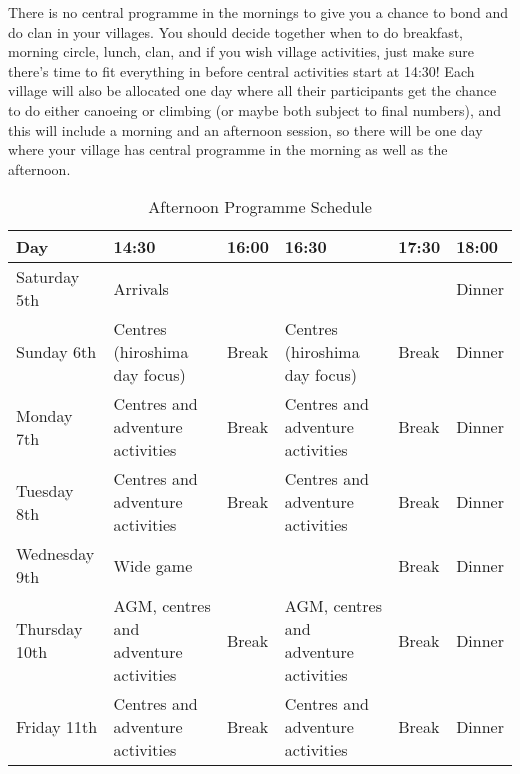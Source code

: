 \documentclass[a4paper, 11pt]{report}
\begin{document}
There is no central programme in the mornings to give you a chance to bond and do clan in your villages. You should decide together when to do breakfast, morning circle, lunch, clan, and if you wish village activities, just make sure there's time to fit everything in before central activities start at 14:30! Each village will also be allocated one day where all their participants get the chance to do either canoeing or climbing (or maybe both subject to final numbers), and this will include a morning and an afternoon session, so there will be one day where your village has central programme in the morning as well as the afternoon.
\begin{table}[H]
    \centering
    {\RaggedRight
    \begin{tabular}{p{} p{} p{} p{} p{} p{}}
        \textbf{Day} & \textbf{14:30} & \textbf{16:00} & \textbf{16:30} & \textbf{17:30} & \textbf{18:00} \\
        \hline
        Saturday 5th & \multicolumn{4}{l}{Arrivals} & Dinner \\
        \hline
        Sunday 6th & \cellcolor[HTML]{6AA84F}Centres (hiroshima day focus) & Break & \cellcolor[HTML]{6AA84F}Centres (hiroshima day focus) & Break & Dinner \\
        \hline
        Monday 7th & \cellcolor[HTML]{6AA84F}Centres and adventure activities & Break & \cellcolor[HTML]{6AA84F}Centres and adventure activities & Break & Dinner \\
        \hline
        Tuesday 8th & \cellcolor[HTML]{FBBC04}Centres and adventure activities & Break & \cellcolor[HTML]{FBBC04}Centres and adventure activities & Break & Dinner \\
        \hline
        Wednesday 9th & \multicolumn{3}{l}{\cellcolor[HTML]{FBBC04}Wide game} & Break & Dinner \\
        \hline
        Thursday 10th & \cellcolor[HTML]{EA4335}AGM, centres and adventure activities & Break & \cellcolor[HTML]{EA4335}AGM, centres and adventure activities & Break & Dinner \\
        \hline 
        Friday 11th & \cellcolor[HTML]{EA4335}Centres and adventure activities & Break & \cellcolor[HTML]{EA4335}Centres and adventure activities & Break & Dinner\\
        \hline
    \end{tabular}
    }%
    \caption{Afternoon Programme Schedule}
\end{table}
\end{document}
